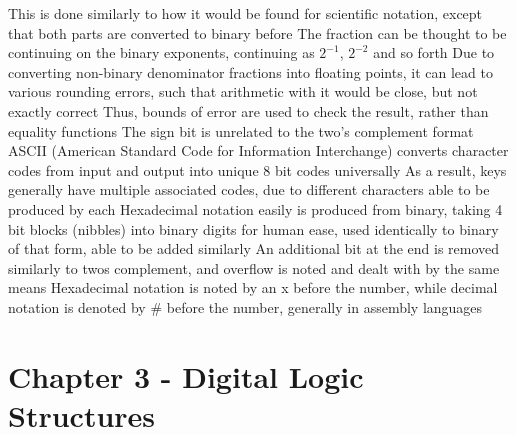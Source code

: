 \documentclass[11 pt, twoside]{article}
\newenvironment{outline*}
{
	\begin{outline}[enumerate]
	}
	{\end{outline}
}
\begin{document}
\begin{outline*}
\3 This is done similarly to how it would be found for scientific notation, except that both parts are converted to binary before
\3 The fraction can be thought to be continuing on the binary exponents, continuing as $2^{-1}$, $2^{-2}$ and so forth
\3 Due to converting non-binary denominator fractions into floating points, it can lead to various rounding errors, such that arithmetic with it would be close, but not exactly correct
\4 Thus, bounds of error are used to check the result, rather than equality functions
\2 The sign bit is unrelated to the two's complement format
\1 ASCII (American Standard Code for Information Interchange) converts character codes from input and output into unique 8 bit codes universally
\2 As a result, keys generally have multiple associated codes, due to different characters able to be produced by each
\1 Hexadecimal notation easily is produced from binary, taking 4 bit blocks (nibbles) into binary digits for human ease, used identically to binary of that form, able to be added similarly
\2 An additional bit at the end is removed similarly to twos complement, and overflow is noted and dealt with by the same means
\1 Hexadecimal notation is noted by an x before the number, while decimal notation is denoted by \# before the number, generally in assembly languages
\end{outline*}
\section{Chapter 3 - Digital Logic Structures}
\end{document}
